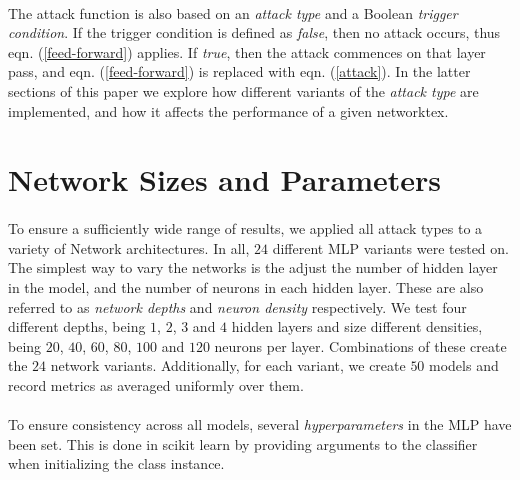 \documentclass[12pt,letterpaper]{article}
\begin{document}
\paragraph*{}The attack function is also based on an \textit{attack type} and a Boolean \textit{trigger condition}. If the trigger condition is defined as \textit{false}, then no attack occurs, thus eqn. (\ref{feed-forward}) applies. If \textit{true}, then the attack commences on that layer pass, and eqn. (\ref{feed-forward}) is replaced with eqn. (\ref{attack}). In the latter sections of this paper we explore how different variants of the \textit{attack type} are implemented, and how it affects the performance of a given networktex.


\section*{Network Sizes and Parameters}

\paragraph*{}To ensure a sufficiently wide range of results, we applied all attack types to a variety of Network architectures. In all, $24$ different MLP variants were tested on. The simplest way to vary the networks is the adjust the number of hidden layer in the model, and the number of neurons in each hidden layer. These are also referred to as \textit{network depths} and \textit{neuron density} respectively. We test four different depths, being $1$, $2$, $3$ and $4$ hidden layers and size different densities, being $20$, $40$, $60$, $80$, $100$ and $120$ neurons per layer. Combinations of these create the $24$ network variants. Additionally, for each variant, we create $50$ models and record metrics as averaged uniformly over them.

\paragraph*{}To ensure consistency across all models, several \textit{hyperparameters} in the MLP have been set. This is done in scikit learn by providing arguments to the classifier when initializing the class instance.
\end{document}
